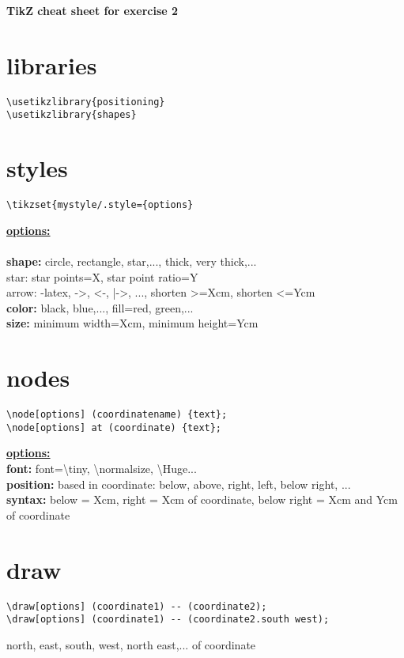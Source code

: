 \documentclass[a4paper,10pt,toc=bibliography,twoside,numbers=noenddot]{scrbook}
\begin{document}
\begin{center} 
	\textbf{\Large TikZ cheat sheet for exercise 2}\\
	\vspace{1cm}
	
\end{center}

\section*{libraries}

\begin{lstlisting}
\usetikzlibrary{positioning}
\usetikzlibrary{shapes}
\end{lstlisting}
\vspace{0.8cm}
		
\section*{styles}
\begin{lstlisting}
\tikzset{mystyle/.style={options}
\end{lstlisting}
\underline{\textbf{options:}}\\ \\
\textbf{shape:} circle, rectangle, star,..., thick, very thick,...\\
\phantom{x} star: star points=X, star point ratio=Y\\
\phantom{x} arrow: -latex, ->, <-, |->, ..., shorten >=Xcm, shorten <=Ycm\\
\textbf{color:} black, blue,..., fill=red, green,...\\
\textbf{size:} minimum width=Xcm, minimum height=Ycm
\vspace{0.8cm}

\section*{nodes}
\begin{lstlisting}
\node[options] (coordinatename) {text};
\node[options] at (coordinate) {text};
\end{lstlisting}
\underline{\textbf{options:}}\\
\textbf{font:} font={\tiny \textbackslash tiny}, {\normalsize \textbackslash normalsize}, {\Huge \textbackslash Huge}...\\
\textbf{position:} based in coordinate: below, above, right, left, below right, ...\\
\textbf{syntax:} below = Xcm, right = Xcm of coordinate, below right = Xcm and Ycm of coordinate
\vspace{0.8cm}

\section*{draw}
\begin{lstlisting}
\draw[options] (coordinate1) -- (coordinate2);
\draw[options] (coordinate1) -- (coordinate2.south west);
\end{lstlisting}
north, east, south, west, north east,... of coordinate
\end{document}
